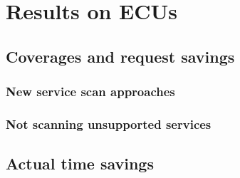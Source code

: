 \section{Results on ECUs}

\subsection{Coverages and request savings}

\subsubsection{New service scan approaches}

\subsubsection{Not scanning unsupported services}

\subsection{Actual time savings}
